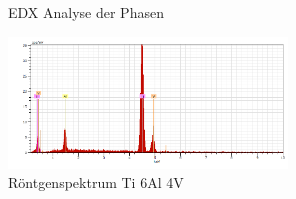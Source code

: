 \documentclass[a4paper, 11pt]{tubsreprt}
\begin{document}
\begin{figure}
\caption{EDX Analyse der Phasen}
\label{EDX Analyse der Phasen}
\end{figure}
\begin{figure}
\centering
\includegraphics[width=0.66\textwidth]{Bilder/Roentgenspektrumti64.png}
\caption{Röntgenspektrum Ti 6Al 4V}
\label{Röntgenspektrum}
\end{figure}
\end{document}

